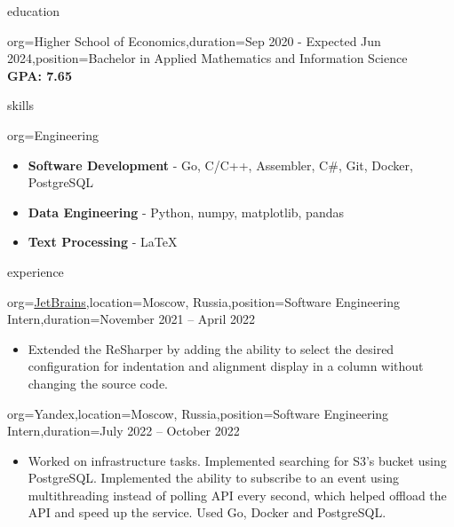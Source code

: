\documentclass{resume}
\begin{document}
\makeheader

\begin{ResumeSection}{education}
    \begin{ResumeSubsection}{org={Higher School of Economics},duration={Sep 2020 - Expected Jun 2024},position={Bachelor in Applied Mathematics and Information Science}}
        \\\bf GPA: 7.65 
    \end{ResumeSubsection}
\end{ResumeSection}


\begin{ResumeSection}{skills}
    \newcommand{\skill}[2]{\textbf{#1} - #2}
    \begin{ResumeSubsection}{org=Engineering}
        \begin{itemize}
            \item \skill{Software Development}{Go, C/C++, Assembler, C#, Git, Docker, PostgreSQL}
            \item \skill{Data Engineering}{Python, numpy, matplotlib, pandas}
            \item \skill{Text Processing}{LaTeX}
        \end{itemize}
    \end{ResumeSubsection}
\end{ResumeSection}

\begin{ResumeSection}{experience}
    \begin{ResumeSubsection}{org=\href{https://www.jetbrains.com/}{JetBrains},location={Moscow, Russia},position={Software Engineering Intern},duration=November 2021 – April 2022}
        \begin{itemize}
            \item {
                Extended the ReSharper by adding the ability to select the desired configuration for indentation and alignment
display in a column without changing the source code.
            }
        \end{itemize}
    \end{ResumeSubsection}

    \begin{ResumeSubsection}{org=Yandex,location={Moscow, Russia},position={Software Engineering Intern},duration=July 2022 – October 2022}
        \begin{itemize}
            \item {
                Worked on infrastructure tasks. Implemented searching for S3’s bucket using PostgreSQL. Implemented the ability to subscribe to an event using multithreading instead of polling API every second, which helped offload the API and speed up the service. Used Go, Docker and PostgreSQL.
            }
        \end{itemize}
    \end{ResumeSubsection}
\end{ResumeSection}
\end{document}
